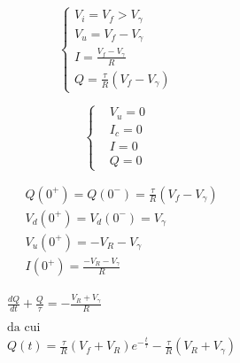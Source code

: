 \documentclass[../elettronica]{subfiles}
\begin{document}
\begin{minipage}{.47\textwidth}
    \begin{tcolorbox}[title=Circuito a diodo acceso]
        \[\begin{cases}
            V_i = V_f > V_\gamma\\
            V_u = V_f - V_\gamma\\
            I = \frac{V_f - V_\gamma}{R}\\
            Q = \frac{\tau}{R}(V_f - V_\gamma)
        \end{cases}\]
    \end{tcolorbox}
\end{minipage}
\begin{minipage}{.47\textwidth}
    \begin{tcolorbox}[title={Circuito da $t > 0$ a $t \to \infty$}]
        \[\begin{cases}
        &V_u = 0\\
        &I_c = 0\\
        &I = 0\\
        &Q = 0
        \end{cases}
    \]
    \end{tcolorbox}
\end{minipage}

\begin{minipage}{.47\textwidth}
    \begin{tcolorbox}[title={Condizioni iniziali $t = 0^+$}]
        \begin{align*}
            &Q(0^+) = Q(0^-) = \frac{\tau}{R}(V_f - V_\gamma)\\
            &V_d(0^+) = V_d(0^-) = V_\gamma\\
            &V_u(0^+) = -V_R - V_\gamma\\
            &I(0^+) = \frac{-V_R - V_\gamma}{R}
        \end{align*}
    \end{tcolorbox}
\end{minipage}
\begin{minipage}{.47\textwidth}
    \begin{tcolorbox}[title={Circuito a $t > 0$}]
        \begin{align*}
            &\frac{dQ}{dt} + \frac{Q}{\tau} = -\frac{V_R + V_\gamma}{R}\\
            \\
            &\text{da cui}
            \\
            &Q(t) = \frac{\tau}{R}(V_f + V_R) e ^ {-\frac{t}{\tau}} - \frac{\tau}{R}(V_R + V_\gamma)
        \end{align*}
    \end{tcolorbox}
\end{minipage}
\end{document}
